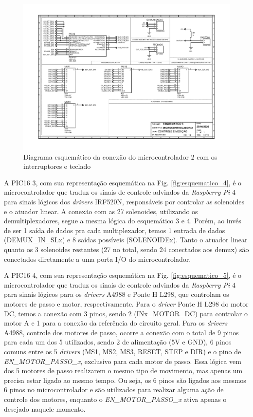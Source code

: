 \begin{apendicesenv}
\begin{landscape}
\begin{figure}[H]
    \centering
    \includegraphics[width=1.25\textwidth, height=2\textheight,keepaspectratio]{figuras/eletronica/esquematicos/esquematico_3_micro2.pdf}
    \caption{Diagrama esquemático da conexão do microcontrolador 2 com os interruptores e teclado}
    \label{fig:esquematico_3}
\end{figure}
\end{landscape}

A PIC16 3, com sua representação esquemática na Fig. \ref{fig:esquematico_4}, é o microcontrolador que traduz os sinais de controle advindos da \textit{Raspberry Pi} 4 para sinais lógicos dos \textit{drivers} IRF520N, responsáveis por controlar as solenoides e o atuador linear. A conexão com as 27 solenoides, utilizando os demultiplexadores, segue a mesma lógica do esquemático 3 e 4. Porém, ao invés de ser 1 saída de dados pra cada multiplexador, temos 1 entrada de dados (DEMUX\_IN\_SLx) e 8 saídas possíveis (SOLENOIDEx). Tanto o atuador linear quanto os 3 solenoides restantes (27 no total, sendo 24 conectados aos demux) são conectados diretamente a uma porta I/O do microcontrolador.

A PIC16 4, com sua representação esquemática na Fig. \ref{fig:esquematico_5}, é o microcontrolador que traduz os sinais de controle advindos da \textit{Raspberry Pi} 4 para sinais lógicos para os \textit{drivers} A4988 e Ponte H L298, que controlam os motores de passo e motor, respectivamente. Para o \textit{driver} Ponte H L298 do motor DC, temos a conexão com 3 pinos, sendo 2 (INx\_MOTOR\_DC) para controlar o motor A e 1 para a conexão da referência do circuito geral. Para os \textit{drivers} A4988, controle dos motores de passo, ocorre a conexão com o total de 9 pinos para cada um dos 5 utilizados, sendo 2 de alimentação (5V e GND), 6 pinos comuns entre os 5 \textit{drivers} (MS1, MS2, MS3, RESET, STEP e DIR) e o pino de \textit{EN\_MOTOR\_PASSO\_x}, exclusivo para cada motor de passo. Essa lógica vem dos 5 motores de passo realizarem o mesmo tipo de movimento, mas apenas um precisa estar ligado ao mesmo tempo. Ou seja, os 6 pinos são ligados aos mesmos 6 pinos no microcontrolador e são utilizados para realizar alguma ação de controle dos motores, enquanto o \textit{EN\_MOTOR\_PASSO\_x} ativa apenas o desejado naquele momento.


\end{apendicesenv}
